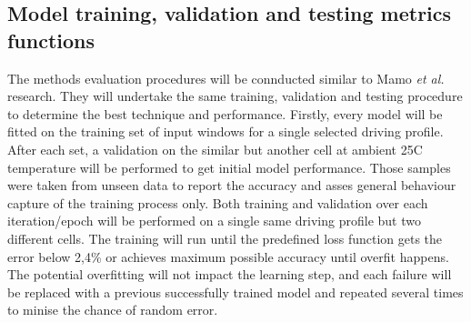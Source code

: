 \subsection{Model training, validation and testing metrics functions}
The methods evaluation procedures will be connducted similar to Mamo \textit{et al.}~\cite{mamo_long_2020} research.
They will undertake the same training, validation and testing procedure to determine the best technique and performance.
%
Firstly, every model will be fitted on the training set of input windows for a single selected driving profile.
After each set, a validation on the similar but another cell at ambient 25\textdegree{}C temperature will be performed to get initial model performance.
Those samples were taken from unseen data to report the accuracy and asses general behaviour capture of the training process only.
%
Both training and validation over each iteration/epoch will be performed on a single same driving profile but two different cells.
%
The training will run until the predefined loss function gets the error below 2,4\% or achieves maximum possible accuracy until overfit happens.
The potential overfitting will not impact the learning step, and each failure will be replaced with a previous successfully trained model and repeated several times to minise the chance of random error.

